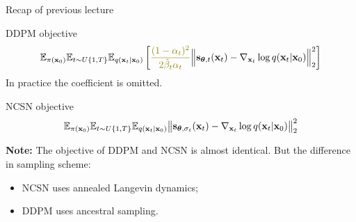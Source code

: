 

\usepackage{tikz}

\usetikzlibrary{arrows,shapes,positioning,shadows,trees}

\begin{frame}
\titlepage
\end{frame}
\begin{frame}{Recap of previous lecture}
	\begin{block}{DDPM objective}
		\vspace{-0.5cm}
		\[
			\bbE_{\pi(\bx_0)} \bbE_{t \sim U\{1, T\}}\bbE_{q(\bx_t | \bx_0)} \left[ {\color{olive}\frac{(1 - \alpha_t)^2}{2\tilde{\beta}_t \alpha_t}} \Bigl\|  \bs_{\btheta, t} (\bx_t) - \nabla_{\bx_t} \log q(\bx_t | \bx_0) \Bigr\|_2^2  \right]
		\]
		In practice {\color{olive}the coefficient} is omitted.
	\end{block}
	\begin{block}{NCSN objective}
		\vspace{-0.3cm}
		\[
			\mathbb{E}_{\pi(\mathbf{x}_0)} \mathbb{E}_{t \sim U\{1, T\}} \mathbb{E}_{q(\mathbf{x}_t | \mathbf{x}_0)}\bigl\| \mathbf{s}_{\boldsymbol{\theta}, \sigma_t}(\mathbf{x}_t) - \nabla_{\mathbf{x}_t} \log q(\mathbf{x}_t | \mathbf{x}_0) \bigr\|^2_2 
		\]
		\vspace{-0.3cm}
	\end{block}
	\textbf{Note:} The objective of DDPM and NCSN is almost identical. But the difference in sampling scheme:
	\begin{itemize}
		\item NCSN uses annealed Langevin dynamics;
		\item DDPM uses ancestral sampling.
	\end{itemize}
	\end{frame}
